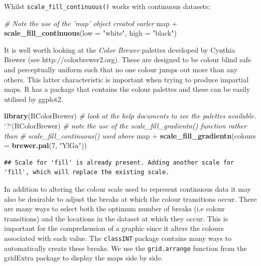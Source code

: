 \documentclass[]{article}
\newenvironment{Shaded}{}{}
\newcommand{\KeywordTok}[1]{\textcolor[rgb]{0.00,0.44,0.13}{\textbf{{#1}}}}
\newcommand{\DataTypeTok}[1]{\textcolor[rgb]{0.56,0.13,0.00}{{#1}}}
\newcommand{\DecValTok}[1]{\textcolor[rgb]{0.25,0.63,0.44}{{#1}}}
\newcommand{\StringTok}[1]{\textcolor[rgb]{0.25,0.44,0.63}{{#1}}}
\newcommand{\CommentTok}[1]{\textcolor[rgb]{0.38,0.63,0.69}{\textit{{#1}}}}
\newcommand{\NormalTok}[1]{{#1}}
\begin{document}
Whilst \texttt{scale\_fill\_continuous()} works with continuous
datasets:

\begin{Shaded}
\begin{Highlighting}[]
\CommentTok{# Note the use of the 'map' object created earler}
\NormalTok{map + }\KeywordTok{scale_fill_continuous}\NormalTok{(}\DataTypeTok{low =} \StringTok{"white"}\NormalTok{, }\DataTypeTok{high =} \StringTok{"black"}\NormalTok{)}
\end{Highlighting}
\end{Shaded}

It is well worth looking at the \emph{Color Brewer} palettes developed
by Cynthia Brewer (see http://colorbrewer2.org). These are designed to
be colour blind safe and perceptually uniform such that no one colour
jumps out more than any others. This latter characteristic is important
when trying to produce impartial maps. R has a package that contains the
colour palettes and these can be easily utilised by ggplot2.

\begin{Shaded}
\begin{Highlighting}[]
\KeywordTok{library}\NormalTok{(RColorBrewer)}
\CommentTok{# look at the help documents to see the palettes available.}
\StringTok{`}\DataTypeTok{?}\StringTok{`}\NormalTok{(RColorBrewer)}
\CommentTok{# note the use of the scale_fill_gradientn() function rather than}
\CommentTok{# scale_fill_continuous() used above}
\NormalTok{map + }\KeywordTok{scale_fill_gradientn}\NormalTok{(}\DataTypeTok{colours =} \KeywordTok{brewer.pal}\NormalTok{(}\DecValTok{7}\NormalTok{, }\StringTok{"YlGn"}\NormalTok{))}
\end{Highlighting}
\end{Shaded}

\begin{verbatim}
## Scale for 'fill' is already present. Adding another scale for 'fill', which will replace the existing scale.
\end{verbatim}

In addition to altering the colour scale used to represent continuous
data it may also be desirable to adjust the breaks at which the colour
transitions occur. There are many ways to select both the optimum number
of breaks (i.e colour transitions) and the locations in the dataset at
which they occur. This is important for the comprehension of a graphic
since it alters the colours associated with each value. The
\texttt{classINT} package contains many ways to automatically create
these breaks. We use the \texttt{grid.arrange} function from the
gridExtra package to display the maps side by side.
\end{document}
